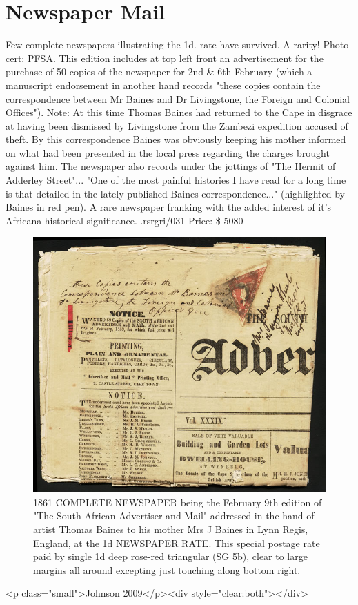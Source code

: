 
\chapter{Newspaper Mail
} 
Few complete newspapers illustrating the 1d. rate have survived. A rarity! Photo-cert: PFSA. This edition includes at top left front an advertisement for the purchase of 50 copies of the newspaper for 2nd & 6th February (which a manuscript endorsement in another hand records "these copies contain the correspondence between Mr Baines and Dr Livingstone, the Foreign and Colonial Offices"). Note: At this time Thomas Baines had returned to the Cape in disgrace at having been dismissed by Livingstone from the Zambezi expedition accused of theft. By this correspondence Baines was obviously keeping his mother informed on what had been presented in the local press regarding the charges brought against him. The newspaper also records under the jottings of "The Hermit of Adderley Street"... "One of the most painful histories I have read for a long time is that detailed in the lately published Baines correspondence..." (highlighted by Baines in red pen). A rare newspaper franking with the added interest of it's Africana historical significance. .rsrgri/031	
Price: \$ 5080

\begin{figure}

\includegraphics[width=1.0\textwidth]{../cape-of-good-hope/newspaper-triangular.jpg}
\caption{
1861 COMPLETE NEWSPAPER being the February 9th edition of "The South African Advertiser and Mail" addressed in the hand of artist Thomas Baines to his mother Mrs J Baines in Lynn Regis, England, at the 1d NEWSPAPER RATE. This special postage rate paid by single 1d deep rose-red triangular (SG 5b), clear to large margins all around excepting just touching along bottom right. }
\end{figure}

<p class="small">Johnson 2009</p><div style="clear:both"></div>

 
  